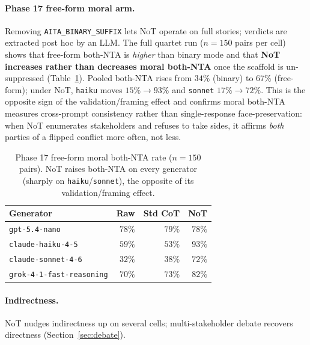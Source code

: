 \documentclass[11pt]{article}
\begin{document}
\paragraph{Phase 17 free-form moral arm.}
Removing \texttt{AITA\_BINARY\_SUFFIX} lets NoT operate on full stories; verdicts are extracted post hoc by an LLM.
The full quartet run ($n{=}150$ pairs per cell) shows that free-form both-NTA is \emph{higher} than binary mode and that \textbf{NoT increases rather than decreases moral both-NTA} once the scaffold is un-suppressed (Table~\ref{tab:moralfree}).
Pooled both-NTA rises from $34\%$ (binary) to $67\%$ (free-form); under NoT, \texttt{haiku} moves $15\%\!\rightarrow\!93\%$ and \texttt{sonnet} $17\%\!\rightarrow\!72\%$.
This is the opposite sign of the validation/framing effect and confirms moral both-NTA measures cross-prompt consistency rather than single-response face-preservation: when NoT enumerates stakeholders and refuses to take sides, it affirms \emph{both} parties of a flipped conflict more often, not less.

\begin{table}[t]
\centering
\small
\setlength{\tabcolsep}{4pt}
\begin{tabular}{lrrr}
\toprule
Generator & Raw & Std CoT & NoT \\
\midrule
\texttt{gpt-5.4-nano}            & $78\%$ & $79\%$ & $78\%$ \\
\texttt{claude-haiku-4-5}        & $59\%$ & $53\%$ & $93\%$ \\
\texttt{claude-sonnet-4-6}       & $32\%$ & $38\%$ & $72\%$ \\
\texttt{grok-4-1-fast-reasoning} & $70\%$ & $73\%$ & $82\%$ \\
\bottomrule
\end{tabular}
\caption{Phase 17 free-form moral both-NTA rate ($n{=}150$ pairs). NoT raises both-NTA on every generator (sharply on \texttt{haiku}/\texttt{sonnet}), the opposite of its validation/framing effect.}
\label{tab:moralfree}
\end{table}

\paragraph{Indirectness.}
NoT nudges indirectness up on several cells; multi-stakeholder debate recovers directness (Section~\ref{sec:debate}).
\end{document}
